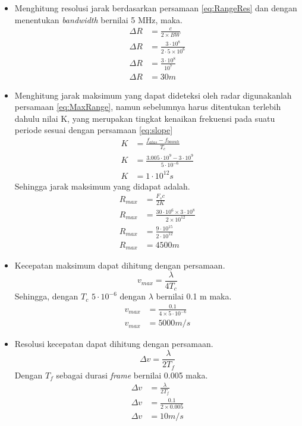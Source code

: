 \begin{itemize}
	\item Menghitung resolusi jarak berdasarkan persamaan \ref{eq:RangeRes} dan dengan menentukan \textit{bandwidth} bernilai 5 MHz, maka.
		\begin{align*}
		\Delta{R} &= \frac{c}{2 \times BW} \\
		\Delta{R} &= \frac{3 \cdot 10^{8}}{2 \cdot 5\times10^{6}}\\
		\Delta{R} &= \frac{3 \cdot 10^{8}}{10^{7}}\\
		\Delta{R} &= 30 m
		\end{align*}
	\item Menghitung jarak maksimum yang dapat dideteksi oleh radar digunakanlah persamaan \ref{eq:MaxRange}, namun sebelumnya harus ditentukan terlebih dahulu nilai K, yang merupakan tingkat kenaikan frekuensi pada suatu periode sesuai dengan persamaan \ref{eq:slope}
		\begin{align*}
		K &= \frac{f_{atas} - f_{bawah}}{T_{c}}\\
		K &= \frac{3.005 \cdot 10^{9} - 3 \cdot 10^{9}}{5 \cdot 10^{-6}}\\
		K &= 1 \cdot 10^{12} s
		\end{align*}
	Sehingga jarak maksimum yang didapat adalah.
		\begin{align*}
		R_{max} &= \frac{F_{s} c}{2 K}\\
		R_{max} &= \frac{30 \cdot 10^{6} \times 3 \cdot 10^{8}}{2 \times 10^{12}}\\			R_{max} &= \frac{9 \cdot 10^{15}}{2 \cdot 10^{12}}\\
		R_{max} &= 4500 m
		\end{align*}
	\item Kecepatan maksimum dapat dihitung dengan persamaan.
		\begin{equation}
		v_{max} = \frac{\lambda}{4 T_{c}}
		\end{equation}
	Sehingga, dengan $T_{c}$ $5 \cdot 10^{-6}$ dengan $\lambda$ bernilai 0.1 m maka.
	\begin{align*}
		v_{max} &= \frac{0.1}{4 \times 5 \cdot 10^{-6}}\\
		v_{max} &= 5000 m/s
	\end{align*}
	\item Resolusi kecepatan dapat dihitung dengan persamaan.
	\begin{equation}
		\Delta{v} = \frac{\lambda}{2 T_{f}}
	\end{equation}
	Dengan $T_{f}$ sebagai durasi \textit{frame} bernilai 0.005 maka.
	\begin{align*}
		\Delta{v} &= \frac{\lambda}{2 T_{f}}\\
		\Delta{v} &= \frac{0.1}{2 \times 0.005}\\
		\Delta{v} &= 10 m/s
	\end{align*}
\end{itemize}

